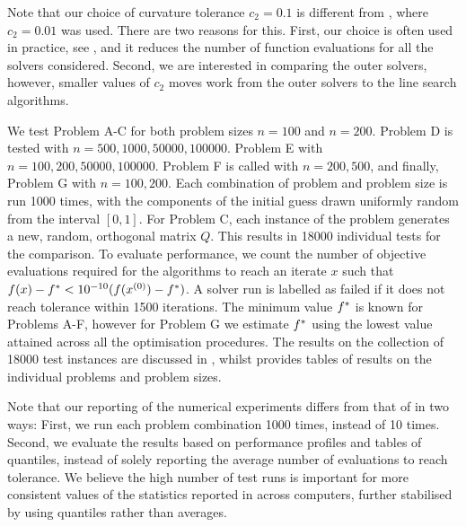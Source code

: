 \documentclass[main.tex]{subfiles}
\begin{document}
Note that our choice of curvature tolerance $c_2=0.1$ is different
from \citet{sterck2013steepest}, where $c_2=0.01$ was used. There are
two reasons for this.  First, our choice is often used in practice,
see \citet[Ch.~3.1]{nocedal2006numerical}, and it reduces the number
of function evaluations for all the solvers considered.  Second, we
are interested in comparing the outer solvers, however, smaller values
of $c_2$ moves work from the outer solvers to the line search
algorithms.

We test Problem A-C for both problem sizes $n=100$ and $n=200$.
Problem D is tested with
$n=\num{500},\num{1000},\num{50000},\num{100000}$.  Problem E with
$n=\num{100},\num{200},\num{50000},\num{100000}$.  Problem F is called
with $n=\num{200},\num{500}$, and finally, Problem G with
$n=\num{100},\num{200}$.  Each combination of problem and problem size
is run \num{1000} times, with the components of the initial guess
drawn uniformly random from the interval $[0,1]$. For Problem C, each
instance of the problem generates a new, random, orthogonal matrix
$Q$.  This results in \num{18000} individual tests for the comparison.
To evaluate performance, we count the number of objective evaluations
required for the algorithms to reach an iterate $x$ such that
$f(x)-f^* < 10^{-10}(f(x^{(0)})-f^*)$. A solver run is
labelled as failed if it does not reach tolerance within \num{1500}
iterations.  The minimum value $f^*$ is known for Problems A-F,
however for Problem G we estimate $f^*$ using the lowest value
attained across all the optimisation procedures.  The results on the
collection of \num{18000} test instances are discussed in
, whilst  provides tables of
results on the individual problems and problem sizes.

Note that our reporting of the numerical experiments differs from that
of \citet{sterck2013steepest} in two ways: First, we run each problem
combination \num{1000} times, instead of \num{10} times. Second, we
evaluate the results based on performance profiles and tables of
quantiles, instead of solely reporting the average number of
evaluations to reach tolerance.  We believe the high number of test
runs is important for more consistent values of the statistics
reported in  across computers, further stabilised by using
quantiles rather than averages.
\end{document}
